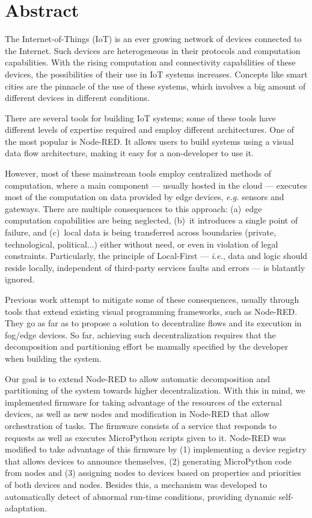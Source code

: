 \chapter*{Abstract}

The Internet-of-Things (IoT) is an ever growing network of devices connected to the Internet. Such devices are heterogeneous in their protocols and computation capabilities. With the rising computation and connectivity capabilities of these devices, the possibilities of their use in IoT systems increases. Concepts like smart cities are the pinnacle of the use of these systems, which involves a big amount of different devices in different conditions.

There are several tools for building IoT systems; some of these tools have different levels of expertise required and employ different architectures. One of the most popular is Node-RED. It allows users to build systems using a visual data flow architecture, making it easy for a non-developer to use it.

However, most of these mainstream tools employ centralized methods of computation, where a main component --- usually hosted in the cloud --- executes most of the computation on data provided by edge devices, \emph{e.g.} sensors and gateways. There are multiple consequences to this approach: (a)~edge computation capabilities are being neglected, (b)~it introduces a single point of failure, and (c)~local data is being transferred across boundaries (private, technological, political...) either without need, or even in violation of legal constraints. Particularly, the principle of Local-First --- \emph{i.e.}, data and logic should reside locally, independent of third-party services faults and errors --- is blatantly ignored.

Previous work attempt to mitigate some of these consequences, usually through tools that extend existing visual programming frameworks, such as Node-RED. They go as far as to propose a solution to decentralize flows and its execution in fog/edge devices. So far, achieving such decentralization requires that the decomposition and partitioning effort be manually specified by the developer when building the system.

Our goal is to extend Node-RED to allow automatic decomposition and partitioning of the system towards higher decentralization. With this in mind, we implemented firmware for taking advantage of the resources of the external devices, as well as new nodes and modification in Node-RED that allow orchestration of tasks. The firmware consists of a service that responds to requests as well as executes MicroPython scripts given to it. Node-RED was modified to take advantage of this firmware by (1) implementing a device registry that allows devices to announce themselves, (2) generating MicroPython code from nodes and (3) assigning nodes to devices based on properties and priorities of both devices and nodes. Besides this, a mechanism was developed to automatically detect of abnormal run-time conditions, providing dynamic self-adaptation.

